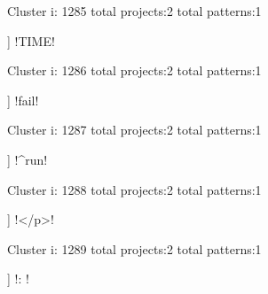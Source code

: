 Cluster i: 1285
total projects:2
total patterns:1
\begin{multicols}{1}
\begin{description}[noitemsep,topsep=0pt]
\item [[2] ] \cverb!TIME!
\end{description}
\end{multicols}







Cluster i: 1286
total projects:2
total patterns:1
\begin{multicols}{1}
\begin{description}[noitemsep,topsep=0pt]
\item [[2] ] \cverb!fail!
\end{description}
\end{multicols}







Cluster i: 1287
total projects:2
total patterns:1
\begin{multicols}{1}
\begin{description}[noitemsep,topsep=0pt]
\item [[2] ] \cverb!^run!
\end{description}
\end{multicols}







Cluster i: 1288
total projects:2
total patterns:1
\begin{multicols}{1}
\begin{description}[noitemsep,topsep=0pt]
\item [[2] ] \cverb!</p>!
\end{description}
\end{multicols}







Cluster i: 1289
total projects:2
total patterns:1
\begin{multicols}{1}
\begin{description}[noitemsep,topsep=0pt]
\item [[2] ] \cverb!:   !
\end{description}
\end{multicols}







